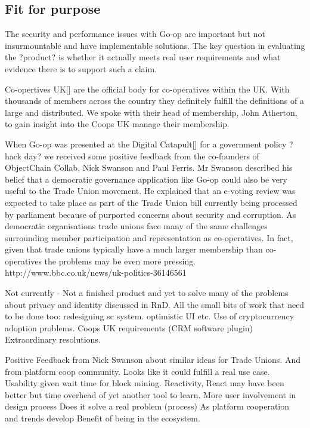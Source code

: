\subsection{Fit for purpose}
The security and performance issues with Go-op are important but not insurmountable and have implementable solutions. The key question in evaluating the ?product? is whether it actually meets real user requirements and what evidence there is to support such a claim. 

Co-opertives UK[] are the official body for co-operatives within the UK. With thousands of members across the country they definitely fulfill the definitions of a large and distributed. We spoke with their head of membership, John Atherton, to gain insight into the Coops UK manage their membership. 

When Go-op was presented at the Digital Catapult[] for a government policy ?hack day? we received some positive feedback from the co-founders of ObjectChain Collab, Nick Swanson and Paul Ferris. Mr Swanson described his belief that a democratic governance application like Go-op could also be very useful to the Trade Union movement. He explained that an e-voting review was expected to take place as part of the Trade Union bill currently being processed by parliament because of purported concerns about security and corruption. As democratic organisations trade unions face many of the same challenges surrounding member participation and representation as co-operatives. In fact, given that trade unions typically have a much larger membership than co-operatives the problems may be even more pressing. 
 http://www.bbc.co.uk/news/uk-politics-36146561  



Not currently - Not a finished product and yet to solve many of the problems about privacy and identity discussed in RnD.
All the small bits of work that need to be done too: redesigning sc system. optimistic UI etc.
Use of cryptocurrency adoption problems.
Coops UK requirements (CRM software plugin)
Extraordinary resolutions. 

Positive Feedback from Nick Swanson about similar ideas for Trade Unions. And from platform coop community. Looks like it could fulfill a real use case.
Usability given wait time for block mining. 
Reactivity, React may have been better but time overhead of yet another tool to learn. 
More user involvement in design process
Does it solve a real problem (process)
As platform cooperation and trends develop 
Benefit of being in the ecosystem.

